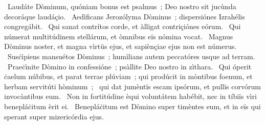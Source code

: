 ~Laudáte Dòminum, quóniam bonus est psalmus~; Deo nostro sit jucùnda decoráque laudáçio. 
~Aedìficans Jerozólyma Dòminus~; dispersiónes Izrahélis congregábit. 
~Qui sanat contrítos corde, et àlligat contriçiónes eórum. 
~Qui númerat multitúdinem stellárum, et òmnibus eïs nómina vocat. 
~Magnus Dòminus noster, et magna vìrtüs ejus, et sapiènçiae ejus non est númerus. 
~Susċìpiens mansuétos Dòminus~; humìlians autem peccatóres usque ad terram. 
~Praeċìnite Dòmino in confessióne~; psàllite Deo nostro in zìthara. 
~Qui óperit ċaelum núbibus, et parat terrae plúviam~; qui prodúcit in mòntibus foenum, et herbam servitúti hòminum~; 
~qui dat jumèntïs escam ipsórum, et pullïs corvórum invocàntibus eum. 
~Non in fortitúdine èqui voluntátem habébit, nec in tíbiïs vìri benepláċitum èrit ei. 
~Benepláċitum est Dòmino super timèntes eum, et in eïs qui sperant super mizericórdia ejus. 
